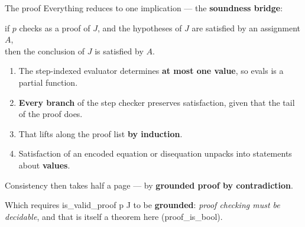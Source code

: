 \documentclass[aspectratio=169,11pt]{beamer}
\newcommand{\code}[1]{{\ttfamily\footnotesize #1}}
\newcommand{\key}[1]{{\color{accent}\textbf{#1}}}
\begin{document}
\begin{frame}{The proof}
  \vfill
  Everything reduces to one implication --- the \key{soundness bridge}:
  \begin{center}\small
    if $p$ checks as a proof of $J$, and the hypotheses of $J$ are satisfied by an
    assignment $A$,\\ then the conclusion of $J$ is satisfied by $A$.
  \end{center}
  \vfill
  \pause
  \small
  \begin{enumerate}\itemsep0.4em
    \item The step-indexed evaluator determines \key{at most one value}, so
          \code{evals} is a partial function.
    \item \key{Every branch} of the step checker preserves satisfaction, given that
          the tail of the proof does.
    \item That lifts along the proof list \key{by induction}.
    \item Satisfaction of an encoded equation or disequation unpacks into statements
          about \key{values}.
  \end{enumerate}
  \vfill
  \pause
  \normalsize
  Consistency then takes half a page --- by \key{grounded proof by contradiction}.
  \begin{center}\small
    Which requires \code{is\_valid\_proof p J} to be \key{grounded}: \emph{proof
    checking must be decidable}, and that is itself a theorem here
    (\code{proof\_is\_bool}).
  \end{center}
  \vfill
\end{frame}
\end{document}
